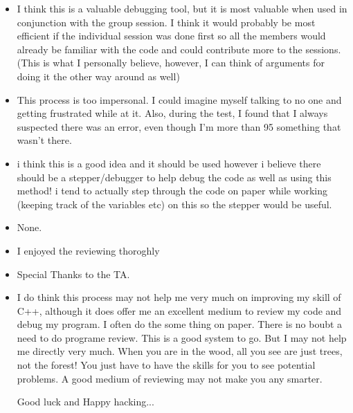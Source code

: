 \begin{enumerate}
\begin{itemize}
\item I think this is a valuable debugging tool, but it is most valuable
when used in conjunction with the group session.  I think it would
probably be most efficient if the individual session was done first so
all the members would already be familiar with the code and could
contribute more to the sessions. (This is what I personally believe,
however, I can think of arguments for doing it the other way around as well)
\item This process is too impersonal.  I could imagine myself talking to no
one and getting frustrated while at it.  Also, during the test, I
found that I always suspected there was an error, even though I'm more
than 95%
something that wasn't there.
\item i think this is a good idea and it should be used however i believe
there should be a stepper/debugger to help debug the code as well
as using this method! i tend to actually step through the code on
paper while working (keeping track of the variables etc)
on this so the stepper would be useful.


\item None.
\item I enjoyed the reviewing thoroghly
\item Special Thanks to the TA.
\item I do think this process may not help me very much on improving my skill of
C++, although it does offer me an excellent medium to review my code
and debug my program.  I often do the some thing on paper.  There is
no boubt a need to do programe review.  This is a good system to go.
But I may not help me directly very much.  When you are in the wood,
all you see are just trees, not the forest!  You just have to have the
skills for you to see potential problems.  A good medium of reviewing
may not make you any smarter.

Good luck and Happy hacking...

\end{itemize}


\end{enumerate}

